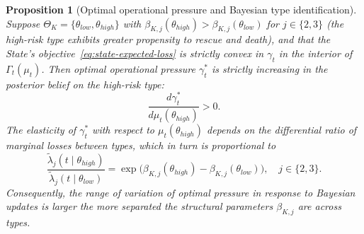 \documentclass[12pt,a4paper]{article}
\theoremstyle{plain}
\newtheorem{proposition}[theorem]{Proposition}
\theoremstyle{definition}
\theoremstyle{remark}
\newcommand{\1}{\mathbf{1}}
\begin{document}
\begin{proposition}[Optimal operational pressure and Bayesian type identification]
\label{prop:optimal-gamma-beliefs}
Suppose $\Theta_K=\{\theta_{low},\theta_{high}\}$ with
$\beta_{K,j}(\theta_{high})>\beta_{K,j}(\theta_{low})$ for $j\in\{2,3\}$
\textup{(the high-risk type exhibits greater propensity to rescue and death)}, and that
the State's objective~\eqref{eq:state-expected-loss} is strictly convex in $\gamma_t$ in
the interior of $\Gamma_t(\mu_t)$. Then optimal operational pressure $\gamma_t^\ast$ is
strictly increasing in the posterior belief on the high-risk type:
\[
\frac{d\gamma_t^\ast}{d\mu_t(\theta_{high})} > 0.
\]
The elasticity of $\gamma_t^\ast$ with respect to $\mu_t(\theta_{high})$ depends on the
differential ratio of marginal losses between types, which in turn is proportional to
\[
\frac{\tilde\lambda_j(t\mid\theta_{high})}{\tilde\lambda_j(t\mid\theta_{low})}
= \exp\!\bigl(\beta_{K,j}(\theta_{high})-\beta_{K,j}(\theta_{low})\bigr), \quad j\in\{2,3\}.
\]
Consequently, the range of variation of optimal pressure in response to Bayesian
updates is larger the more separated the structural parameters $\beta_{K,j}$ are across
types.
\end{proposition}
\end{document}
